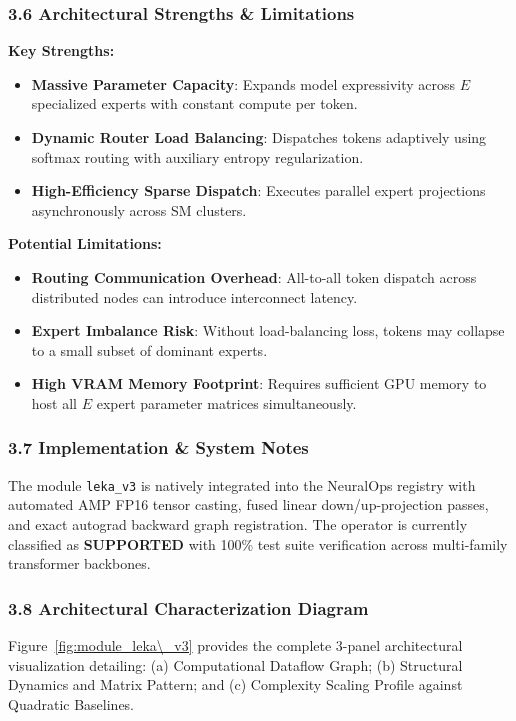 \subsubsection*{3.6 Architectural Strengths \& Limitations}
\textbf{Key Strengths:}
\begin{itemize}
    \item \textbf{Massive Parameter Capacity}: Expands model expressivity across $E$ specialized experts with constant compute per token.
    \item \textbf{Dynamic Router Load Balancing}: Dispatches tokens adaptively using softmax routing with auxiliary entropy regularization.
    \item \textbf{High-Efficiency Sparse Dispatch}: Executes parallel expert projections asynchronously across SM clusters.
\end{itemize}

\textbf{Potential Limitations:}
\begin{itemize}
    \item \textbf{Routing Communication Overhead}: All-to-all token dispatch across distributed nodes can introduce interconnect latency.
    \item \textbf{Expert Imbalance Risk}: Without load-balancing loss, tokens may collapse to a small subset of dominant experts.
    \item \textbf{High VRAM Memory Footprint}: Requires sufficient GPU memory to host all $E$ expert parameter matrices simultaneously.
\end{itemize}

\subsubsection*{3.7 Implementation \& System Notes}
The module \texttt{leka\_v3} is natively integrated into the NeuralOps registry with automated AMP FP16 tensor casting, fused linear down/up-projection passes, and exact autograd backward graph registration. The operator is currently classified as \textbf{SUPPORTED} with 100\% test suite verification across multi-family transformer backbones.

\subsubsection*{3.8 Architectural Characterization Diagram}
Figure~\ref{fig:module_leka\_v3} provides the complete 3-panel architectural visualization detailing: (a) Computational Dataflow Graph; (b) Structural Dynamics and Matrix Pattern; and (c) Complexity Scaling Profile against Quadratic Baselines.

